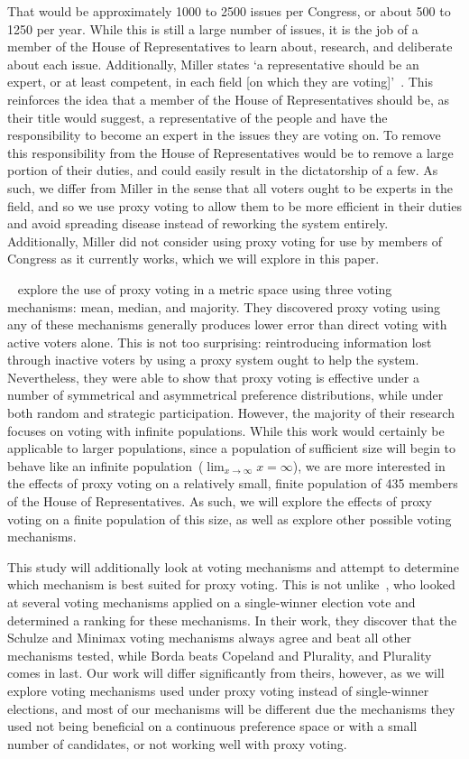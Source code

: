 That would be approximately 1000 to 2500 issues per Congress, or about 500 to 1250 per
year.
While this is still a large number of issues, it is the job of a member of the House
of Representatives to learn about, research, and deliberate about each issue.
Additionally, Miller states `a representative should be an expert, or at least
competent, in each field [on which they are voting]'~\cite{Miller1969}.
This reinforces the idea that a member of the House of Representatives should be, as
their title would suggest, a representative of the people and have the responsibility
to become an expert in the issues they are voting on.
To remove this responsibility from the House of Representatives would be to remove
a large portion of their duties, and could easily result in the dictatorship of a few.
As such, we differ from Miller in the sense that all voters ought to be experts in
the field, and so we use proxy voting to allow them to be more efficient in their
duties and avoid spreading disease instead of reworking the system entirely.
Additionally, Miller did not consider using proxy voting for use by members of
Congress as it currently works, which we will explore in this paper.

~\cite{Cohensius2017} explore the use of proxy voting in a metric space
using three voting mechanisms: mean, median, and majority.
They discovered proxy voting using any of these mechanisms generally produces lower
error than direct voting with active voters alone.
This is not too surprising: reintroducing information lost through inactive voters by
using a proxy system ought to help the system.
Nevertheless, they were able to show that proxy voting is effective under a number of
symmetrical and asymmetrical preference distributions, while under both random and
strategic participation.
However, the majority of their research focuses on voting with infinite populations.
While this work would certainly be applicable to larger populations, since a
population of sufficient size will begin to behave like an infinite
population~($\lim_{x \rightarrow \infty} x = \infty$), we are more interested in the
effects of proxy voting on a relatively small, finite population of 435 members of the
House of Representatives.
As such, we will explore the effects of proxy voting on a finite population of this
size, as well as explore other possible voting mechanisms.

This study will additionally look at voting mechanisms and attempt to determine which
mechanism is best suited for proxy voting.
This is not unlike~\cite{Mathur2017}, who looked at several voting mechanisms applied
on a single-winner election vote and determined a ranking for these mechanisms.
In their work, they discover that the Schulze and Minimax voting mechanisms always
agree and beat all other mechanisms tested, while Borda beats Copeland and Plurality,
and Plurality comes in last.
Our work will differ significantly from theirs, however, as we will explore voting
mechanisms used under proxy voting instead of single-winner elections, and most of
our mechanisms will be different due the mechanisms they used not being beneficial on
a continuous preference space or with a small number of candidates, or not working well
with proxy voting.

